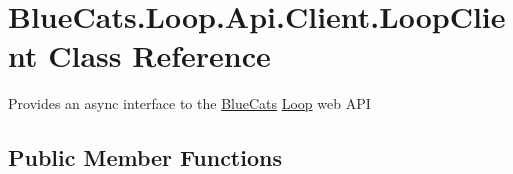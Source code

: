 \hypertarget{class_blue_cats_1_1_loop_1_1_api_1_1_client_1_1_loop_client}{}\section{Blue\+Cats.\+Loop.\+Api.\+Client.\+Loop\+Client Class Reference}
\label{class_blue_cats_1_1_loop_1_1_api_1_1_client_1_1_loop_client}


Provides an async interface to the \mbox{\hyperlink{namespace_blue_cats}{Blue\+Cats}} \mbox{\hyperlink{namespace_blue_cats_1_1_loop}{Loop}} web A\+PI  


\subsection*{Public Member Functions}
